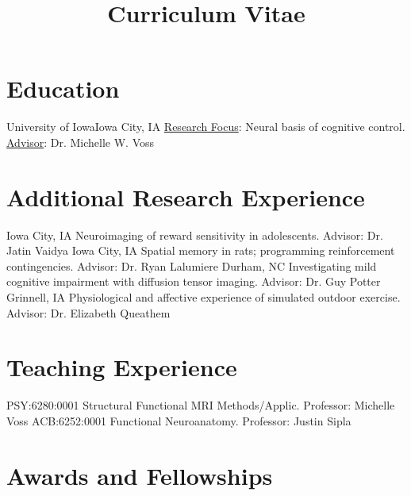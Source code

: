 \documentclass[11pt,letterpaper,sans]{moderncv}
\title{Curriculum Vitae}
\begin{document}
\makecvtitle

\vspace{-1em}
\section{Education}
%
    {University of Iowa}{Iowa City, IA}{}%
    {\underline{Research Focus}: Neural basis of cognitive control.\\
     \underline{Advisor}: Dr. Michelle W. Voss}

\section{Additional Research Experience}
%
    {Iowa City, IA}{}%
    {Neuroimaging of reward sensitivity in adolescents. Advisor: Dr. Jatin Vaidya}
%
    {Iowa City, IA}{}%
    {Spatial memory in rats; programming reinforcement contingencies. Advisor: Dr. Ryan Lalumiere}
%
    {Durham, NC}{}%
    {Investigating mild cognitive impairment with diffusion tensor imaging. Advisor: Dr. Guy Potter}
%
    {Grinnell, IA}{}%
    {Physiological and affective experience of simulated outdoor exercise. Advisor: Dr. Elizabeth Queathem}

\section{Teaching Experience}
%
    {PSY:6280:0001 Structural Functional MRI Methods/Applic. Professor: Michelle Voss}
%
    {ACB:6252:0001 Functional Neuroanatomy. Professor: Justin Sipla}

\section{Awards and Fellowships}
\end{document}
